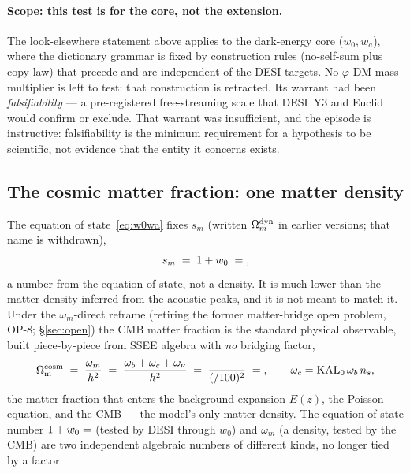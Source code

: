 \documentclass[aps,prd,preprint,amsmath,amssymb,nofootinbib,longbibliography]{revtex4-2}
\newcommand{\Om}{\Omega_{\mathrm{m}}}
\begin{document}
\paragraph{Scope: this test is for the core, not the extension.} The
look-elsewhere statement above applies to the dark-energy core ($w_0,w_a$),
where the dictionary grammar is fixed by construction rules (no-self-sum plus
copy-law) that precede and are independent of the DESI targets. No
$\varphi$-DM mass multiplier is left to test: that construction is retracted. Its
warrant had been \emph{falsifiability} --- a pre-registered free-streaming
scale that DESI~Y3 and Euclid would confirm or exclude. That warrant was
insufficient, and the episode is instructive: falsifiability is the minimum
requirement for a hypothesis to be scientific, not evidence that the entity it
concerns exists.

\subsection{The cosmic matter fraction: one matter density}
\label{sec:two-omega}
The equation of state~\eqref{eq:w0wa} fixes $s_m$ (written
$\Omega_m^{\rm dyn}$ in earlier versions; that name is withdrawn),
\begin{equation}
  s_m \;=\; 1+w_0 \;=\; \val{S_M_d6} ,
  \label{eq:omdyn}
\end{equation}
a number from the equation of state, not a density. It is much lower than
the matter density inferred from the acoustic peaks, and it is not meant to match it. Under
the $\omega_m$-direct reframe (retiring the former matter-bridge open problem,
OP-8; \S\ref{sec:open}) the CMB matter fraction is the
standard physical observable, built piece-by-piece from SSEE algebra with
\emph{no} bridging factor,
\begin{equation}
  \Om^{\mathrm{cosm}} \;=\; \frac{\omega_m}{h^2}
        \;=\; \frac{\omega_b+\omega_c+\omega_\nu}{h^2}
        \;=\; \frac{\val{OMEGA_M_H2_d5}}{(\val{H0_GLOBAL_d5}/100)^2} \;=\; \val{OMEGA_M_TOTAL_d6} ,
  \qquad \omega_c=\mathrm{KAL_0}\,\omega_b\,n_s ,
  \label{eq:omcosm}
\end{equation}
the matter fraction that enters the background expansion $E(z)$, the Poisson
equation, and the CMB --- the model's only matter density. The equation-of-state
number $1+w_0=\val{S_M_d6}$ (tested by DESI through $w_0$) and $\omega_m$ (a density,
tested by the CMB) are two independent algebraic numbers of different kinds, no
longer tied by a factor.
\end{document}
